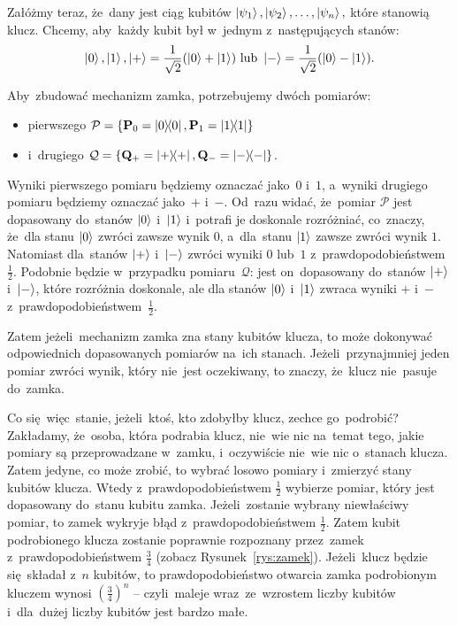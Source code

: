 Załóżmy teraz, że~dany jest ciąg kubitów
$
	\ket{\psi_1},\ket{\psi_2},\ldots,\ket{\psi_n},
$
które stanowią klucz.
Chcemy, aby~każdy kubit był w~jednym z~następujących stanów:
$$
	\ket{0}, \ket{1}, \ket{+}=\frac{1}{\sqrt{2}}(\ket{0}+\ket{1}) \text{ lub } \ket{-}=\frac{1}{\sqrt{2}}(\ket{0}-\ket{1}).
$$

Aby~zbudować mechanizm zamka, potrzebujemy dwóch pomiarów:
\begin{itemize}
	\item pierwszego $\mathcal{P}=\{\mathbf{P}_0=\ketbra{0}{0}, \mathbf{P}_1=\ketbra{1}{1}\}$
	\item i~drugiego
	      $\mathcal{Q}=\{\mathbf{Q}_+=\ketbra{+}{+}, \mathbf{Q}_-=\ketbra{-}{-}\}$.
\end{itemize}
Wyniki pierwszego pomiaru
będziemy oznaczać jako~$0$ i~$1$, a~wyniki drugiego pomiaru będziemy oznaczać jako~$+$ i~$-$. Od~razu widać, że~pomiar
$\mathcal{P}$ jest dopasowany do~stanów $\ket{0}$ i~$\ket{1}$ i~potrafi
je doskonale rozróżniać, co~znaczy, że~dla stanu $\ket{0}$ zwróci zawsze wynik
$0$, a~dla~stanu $\ket{1}$ zawsze zwróci wynik $1$. Natomiast dla~stanów
$\ket{+}$ i~$\ket{-}$ zwróci wyniki $0$ lub~$1$ z~prawdopodobieństwem
$\frac{1}{2}$. Podobnie będzie w~przypadku pomiaru~$\mathcal{Q}$: jest
on~dopasowany do~stanów $\ket{+}$ i~$\ket{-}$, które rozróżnia doskonale,
ale dla stanów $\ket{0}$ i~$\ket{1}$ zwraca wyniki $+$ i~$-$ z~prawdopodobieństwem~$\frac{1}{2}$.

Zatem jeżeli~mechanizm zamka zna stany kubitów klucza, to może dokonywać
odpowiednich dopasowanych pomiarów na~ich stanach. Jeżeli~przynajmniej jeden pomiar zwróci
wynik, który nie~jest oczekiwany, to znaczy, że~klucz nie~pasuje do~zamka.

Co się~więc~stanie, jeżeli~ktoś, kto zdobyłby klucz, zechce go~podrobić?
Zakładamy, że~osoba, która podrabia klucz, nie~wie nic na~temat tego, jakie pomiary są
przeprowadzane w~zamku, i~oczywiście nie~wie nic o~stanach klucza. Zatem jedyne, co może zrobić,
to wybrać losowo pomiary i~zmierzyć stany kubitów klucza. Wtedy z~prawdopodobieństwem
$\frac{1}{2}$ wybierze pomiar, który jest dopasowany do~stanu kubitu zamka.
Jeżeli~zostanie wybrany niewłaściwy pomiar, to zamek wykryje błąd z~prawdopodobieństwem
$\frac{1}{2}$. Zatem kubit podrobionego klucza zostanie poprawnie
rozpoznany przez~zamek z~prawdopodobieństwem $\frac{3}{4}$ (zobacz Rysunek~\ref{rys:zamek}).
Jeżeli~klucz będzie się~składał z~$n$ kubitów, to prawdopodobieństwo otwarcia
zamka podrobionym kluczem wynosi $\left(\frac{3}{4}\right)^n$ -- czyli~maleje
wraz~ze~wzrostem liczby kubitów i~dla~dużej liczby kubitów jest bardzo małe.

